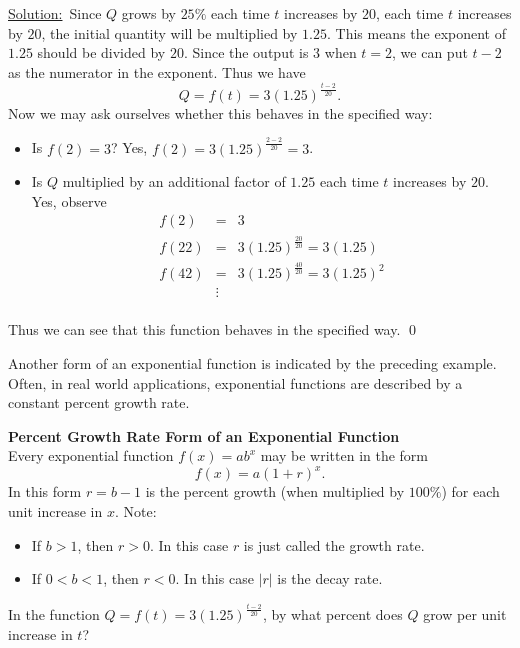 \begin{eg}
\begin{eg}
\underline{Solution:}\ \normalfont Since $Q$ grows by $25\%$ each time $t$ increases by $20$, each time $t$ increases by $20$, the initial quantity will be multiplied by $1.25$. This means the exponent of $1.25$ should be divided by $20$. Since the output is $3$ when $t=2$, we can put $t-2$ as the numerator in the exponent. Thus we have
\[
Q = f(t) = 3(1.25)^{\frac{t-2}{20}}.
\]
Now we may ask ourselves whether this behaves in the specified way:
\begin{itemize}
\item Is $f(2) = 3$? Yes, $f(2) = 3(1.25)^{\frac{2-2}{20}} = 3$.
\item Is $Q$ multiplied by an additional factor of $1.25$ each time $t$ increases by $20$. Yes, observe
\begin{eqnarray*}
f(2) & = & 3\\
f(22) & = & 3(1.25)^{\frac{20}{20}} = 3(1.25)\\
f(42) & = & 3(1.25)^{\frac{40}{20}} = 3(1.25)^2\\
\ & \vdots & \\
\end{eqnarray*}
\end{itemize}
Thus we can see that this function behaves in the specified way. \qed \end{eg}

Another form of an exponential function is indicated by the preceding example. Often, in real world applications, exponential functions are described by a constant percent growth rate. 

\begin{tcolorbox}
{\bf Percent Growth Rate Form of an Exponential Function}\\
Every exponential function $f(x) = ab^{x}$ may be written in the form 
\[
f(x) = a(1+r)^{x}.
\]
In this form $r = b-1$ is the percent growth (when multiplied by $100\%$) for each unit increase in $x$.
Note:
\begin{itemize}
\item If $b>1$, then $r>0$. In this case $r$ is just called the growth rate.
\item If $0<b<1$, then $r<0$. In this case $|r|$ is the decay rate.
\end{itemize}
\end{tcolorbox}

\begin{question} In the function $Q=f(t) = 3(1.25)^{\frac{t-2}{20}}$, by what percent does $Q$ grow per unit increase in $t$?
\end{question}



\end{eg}

